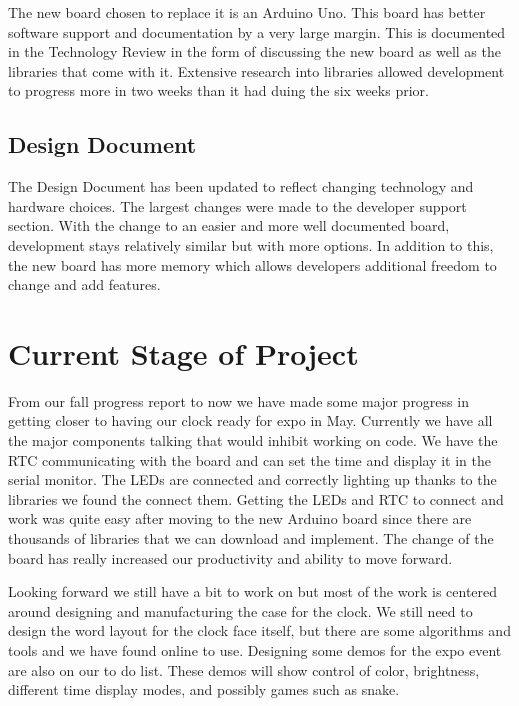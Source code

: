 \documentclass[onecolumn, draftclsnofoot,10pt, compsoc]{IEEEtran}
\begin{document}
The new board chosen to replace it is an Arduino Uno.
This board has better software support and documentation by a very large margin.
This is documented in the Technology Review in the form of discussing the new board as well as the libraries that come with it.
Extensive research into libraries allowed development to progress more in two weeks than it had duing the six weeks prior.

\subsection{Design Document}
The Design Document has been updated to reflect changing technology and hardware choices.
The largest changes were made to the developer support section.
With the change to an easier and more well documented board, development stays relatively similar but with more options.
In addition to this, the new board has more memory which allows developers additional freedom to change and add features.

\section{Current Stage of Project}
From our fall progress report to now we have made some major progress in getting closer to having our clock ready for expo in May.
Currently we have all the major components talking that would inhibit working on code.
We have the RTC communicating with the board and can set the time and display it in the serial monitor.
The LEDs are connected and correctly lighting up thanks to the libraries we found the connect them.
Getting the LEDs and RTC to connect and work was quite easy after moving to the new Arduino board since there are thousands of libraries that we can download and implement.
The change of the board has really increased our productivity and ability to move forward.

Looking forward we still have a bit to work on but most of the work is centered around designing and manufacturing the case for the clock.
We still need to design the word layout for the clock face itself, but there are some algorithms and tools and we have found online to use.
Designing some demos for the expo event are also on our to do list.
These demos will show control of color, brightness, different time display modes, and possibly games such as snake.
\end{document}
